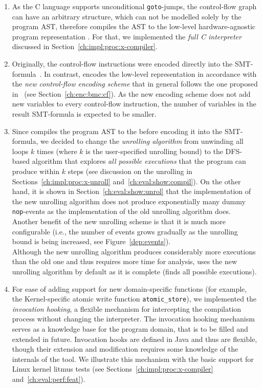 \begin{enumerate}[label=\arabic*.]
\begin{enumerate}[label=\alph*.]
  \item As the C language supports unconditional \texttt{goto}-jumps, the control-flow graph can have an arbitrary structure, which can not be modelled solely by the program AST, therefore \porthos[2] compiles the AST to the low-level hardware-agnostic program representation \xgraph{}.
  For that, we implemented the \textit{full C interpreter} discussed in Section~\ref{ch:impl:proc:x-compiler}.
  
  \item Originally, the control-flow instructions were encoded directly into the SMT-formula~\cite{Porthos17a}.
  In contrast, \porthos[2] encodes the low-level \xgraph{} representation in accordance with the \textit{new control-flow encoding scheme} that in general follows the one proposed in~\cite[Chapter 5.1.2]{heljanko2008unfoldings} (see Section~\ref{ch:enc:bmc:cf}).
  As the new encoding scheme does not add new variables to every control-flow instruction, the number of variables in the result SMT-formula is expected to be smaller.
  
  \item Since \porthos[2] compiles the program AST to the \xgraph{} before encoding it into the SMT-formula, we decided to change the \textit{unrolling algorithm} from unwinding all loops $k$ times (where $k$ is the user-specified unrolling bound) to the DFS-based algorithm that explores \textit{all possible executions} that the program can produce within $k$ steps (see discussion on the unrolling in Sections~\ref{ch:impl:proc:x-unroll} and~\ref{ch:eval:show:compil}).
  On the other hand, it is shown in Section~\ref{ch:eval:show:unrol} that the implementation of the new unrolling algorithm does not produce exponentially many dummy \texttt{nop}-events as the implementation of the old unrolling algorithm does.
  Another benefit of the new unrolling scheme is that it is much more configurable (i.e., the number of events grows gradually as the unrolling bound is being increased, see Figure~\ref{dep:events}). \\
  Although the new unrolling algorithm produces considerably more executions than the old one and thus requires more time for analysis, \porthos[2] uses the new unrolling algorithm by default as it is complete (finds all possible executions).

  \item For ease of adding support for new domain-specific functions (for example, the Kernel-specific atomic write function \texttt{atomic\_store}), we implemented the \textit{invocation hooking}, a flexible mechanism for intercepting the compilation process without changing the interpreter.
  The invocation hooking mechanism serves as a knowledge base for the program domain, that is to be filled and extended in future.
  Invocation hooks are defined in Java and thus are flexible, though their extension and modification requires some knowledge of the internals of the tool.
  We illustrate this mechanism with the basic support for Linux kernel litmus tests (see Sections~\ref{ch:impl:proc:x-compiler} and~\ref{ch:eval:perf:feat}).


\end{enumerate}
\end{enumerate}

